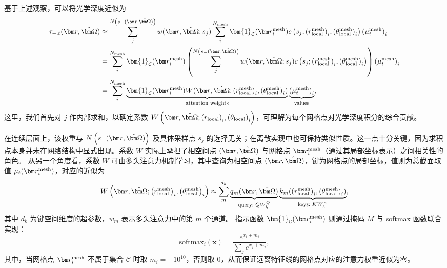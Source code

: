 基于上述观察，可以将光学深度近似为
\begin{equation}
    \begin{aligned}
        \tau_{-,t}(\br,\bOmega) & \approx \sum_j^{N\left(s_{-}(\br,\bOmega)\right)} w(\br, \bOmega;s_j)\sum_{i}^{N_\text{mesh}} \bm{1}_\mathcal{C}(\rmesh_i)c\left(s_j; {(r^\text{mesh}_\text{local})}_i, {(\theta^\text{mesh}_\text{local})}_i\right){(\mu_t^\text{mesh})}_i         \\
                                & =\sum_{i}^{N_\text{mesh}} \bm{1}_\mathcal{C}(\rmesh_i)\left(\sum_{j}^{N\left(s_{-}(\br,\bOmega)\right)} w(\br, \bOmega;s_j)c\left(s_j; {(r^\text{mesh}_\text{local})}_i, {(\theta^\text{mesh}_\text{local})}_i\right)\right){(\mu_t^\text{mesh})}_i \\
                                & =\sum_{i}^{N_\text{mesh}} \underbrace{\bm{1}_\mathcal{C}(\rmesh_i)W(\br,\bOmega; {(r^\text{mesh}_\text{local})}_i, {(\theta^\text{mesh}_\text{local})}_i)}_{\text{attention weights}}\underbrace{{(\mu_t^\text{mesh})}_i}_{\text{values}},
    \end{aligned}
\end{equation}
这里，我们首先对 $j$ 作内部求和，以确定系数 $W\left(\br,\bOmega; {(r_\text{local})}_i, {(\theta_\text{local})}_i\right)$，可理解为每个网格点对光学深度积分的综合贡献。

在连续层面上，该权重与 $N\left(s_{-}(\br,\bOmega)\right)$ 及具体采样点 $s_j$ 的选择无关；在离散实现中也可保持类似性质。这一点十分关键，因为求积点本身并未在网络结构中显式出现。系数 $W$ 实际上承担了相空间点 $(\br,\bOmega)$ 与网格点 $\br_i^{\text{mesh}}$（通过其局部坐标表示）之间相关性的角色。
从另一个角度看，系数 $W$ 可由多头注意力机制学习，其中查询为相空间点 $(\br,\bOmega)$，键为网格点的局部坐标，值则为总截面取值 $\mu_t(\br_i^{\text{mesh}})$，对应的近似为
\begin{equation}
    W\left(\br,\bOmega; {\left(r^\text{mesh}_\text{local}\right)}_i, {\left(\theta^\text{mesh}_\text{local}\right)}_i\right) \approx \sum_{m}^{d_k} \underbrace{q_m(\br,\bOmega)}_{\text{query}:\;QW^Q_h}\underbrace{k_m({(r^\text{mesh}_\text{local})}_i, {(\theta^\text{mesh}_\text{local})}_i)}_{\text{keys}:\;KW^K_h},
\end{equation}
其中 $d_k$ 为键空间维度的超参数，$w_m$ 表示多头注意力中的第 $m$ 个通道。
指示函数 $\bm{1}_\mathcal{C}(\rmesh_i)$ 则通过掩码 $M$ 与 softmax 函数联合实现：
\begin{equation}
    \text{softmax}_i(\bm{x}) = \frac{e^{x_i+m_i}}{\sum_j e^{x_j+m_j}},
\end{equation}
其中，当网格点 $\rmesh_i$ 不属于集合 $\mathcal{C}$ 时取 $m_i=-10^{10}$，否则取 $0$，从而保证远离特征线的网格点对应的注意力权重近似为零。

